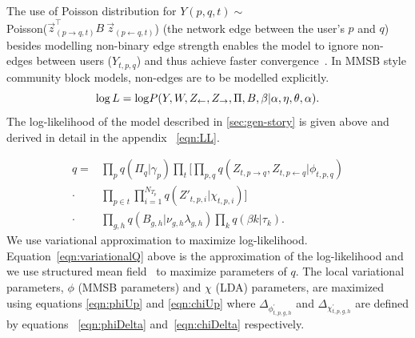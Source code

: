 \documentclass{sig-alternate}
\begin{document}
The use of Poisson distribution for $Y(p,q,t) \sim$ \\
    Poisson(${\overset{\rightarrow}{z}}^{\top}_{(p
\rightarrow q,t)} B~\overset{\rightarrow}{z}_{(p \leftarrow q,t)}$) (the 
network edge between the user's $p$ and $q$) besides modelling non-binary edge
strength enables the model to ignore non-edges between users ($Y_{t,p,q}$) and
thus achieve faster convergence~\cite{Kerrer:Newman}. In MMSB style community block models, 
	 non-edges are to be modelled
explicitly.
\begin{equation}
\log L = \log \! P(Y, W, Z_{\leftarrow}, 
Z_{\rightarrow}, \Pi, B, \beta | \alpha, \eta, \theta, \alpha). \\
\end{equation}
The log-likelihood of the model described in \ref{sec:gen-story} is given
 above and derived in detail in the appendix ~\ref{eqn:LL}.

\begin{align}
q = &\prod_{p}q(\Pi_{q} | \gamma_{p}) \prod_{t} \bigg[ \prod_{p, q} \! 
q(Z_{t, p \rightarrow q}, Z_{t, p \leftarrow q} | \phi_{t,p,q})  \nonumber\\ 
\cdot &\prod_{p \in t} \prod_{i=1}^{N_{T_{p}}} q(Z'_{t,p,i} | \chi_{t,p,i})
\bigg] \nonumber \\
\cdot & \prod_{g,h} q(B_{g,h} | \nu_{g,h} \lambda_{g,h}) \prod_{k} q(\beta{k} |
\tau_{k}).
\label{eqn:variationalQ}
\end{align}
We use variational approximation to maximize log-likelihood.
Equation~\ref{eqn:variationalQ} above is the approximation of the log-likelihood and we
use structured mean field~\cite{Xing_et_al:2003} to maximize parameters of $q$.
The local variational parameters, $\phi$ (MMSB parameters) and $\chi$ (LDA)
parameters, are maximized using equations \ref{eqn:phiUp} and \ref{eqn:chiUp}
where $\Delta_{\phi^{'}_{t,p,g,h}}$ and $\Delta_{\chi^{'}_{t,p,g,h}}$ are
defined by equations ~\ref{eqn:phiDelta} and~\ref{eqn:chiDelta} respectively.
\end{document}
